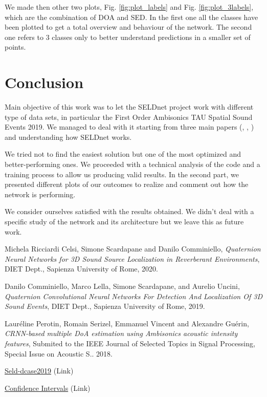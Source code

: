 \documentclass[11pt]{article}
\begin{document}
\noindent
We made then other two plots, Fig. \ref{fig:plot_labels} and Fig. \ref{fig:plot_3labels}, which are the combination of DOA and SED. In the first one all the classes have been plotted to get a total overview and behaviour of the network. The second one refers to 3 classes only to better understand predictions in a smaller set of points.

\newpage
\section{Conclusion}\label{cha:conc}

Main objective of this work was to let the SELDnet project work with different type of data sets, in particular the First Order Ambisonics TAU Spatial Sound Events 2019. We managed to deal with it starting from three main papers (\cite{paper2020}, \cite{paper2019}, \cite{paper2018}) and understanding how SELDnet works.

\noindent
We tried not to find the easiest solution but one of the most optimized and better-performing ones. We proceeded with a technical analysis of the code and a training process to allow us producing valid results. In the second part, we presented different plots of our outcomes to realize and comment out how the network is performing. 

\noindent
We consider ourselves satisfied with the results obtained. We didn't deal with a specific study of the network and its architecture but we leave this as future work.


\newpage
\begin{thebibliography}{999}

  Michela Ricciardi Celsi, Simone Scardapane and Danilo Comminiello,
  \emph{Quaternion Neural Networks for 3D Sound Source
Localization in Reverberant Environments},
  DIET Dept., Sapienza University of Rome,
  2020.

  Danilo Comminiello, Marco Lella, Simone Scardapane, and Aurelio Uncini,
  \emph{Quaternion Convolutional Neural Networks
For Detection And Localization Of 3D Sound Events},
  DIET Dept., Sapienza University of Rome,
  2019.

  Lauréline Perotin, Romain Serizel, Emmanuel Vincent and Alexandre Guérin,
  \emph{CRNN-based multiple DoA estimation using Ambisonics
acoustic intensity features}, Submited to the IEEE Journal of Selected
Topics in Signal Processing, Special Issue on Acoustic S.. 2018.
  
  \href{https://github.com/sharathadavanne/seld-dcase2019}{Seld-dcase2019} (Link)
  
  \href{https://www.mathsisfun.com/data/confidence-interval.html}{Confidence Intervals} (Link)

\end{thebibliography}
\end{document}
